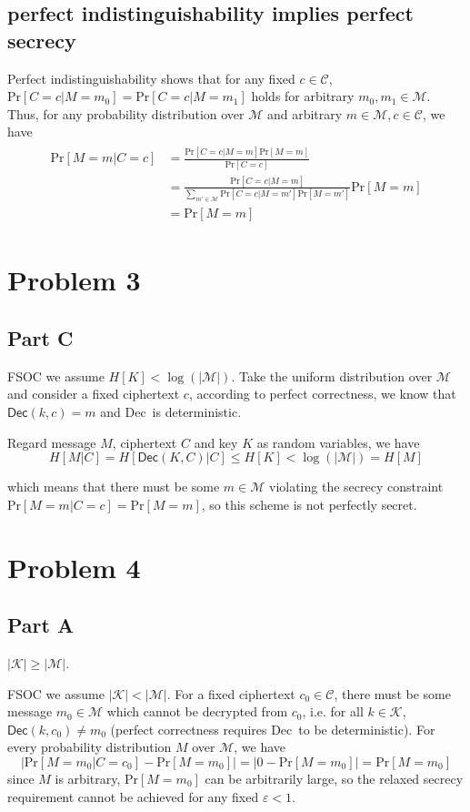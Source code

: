 \documentclass[8pt]{article}
\theoremstyle{compact}
\def\le{\leqslant}
\def\ge{\geqslant}
\def\Pr#1{\text{Pr}\left[{#1}\right]}
\def\Dec{\textsf{Dec}}
\begin{document}
\subsection*{perfect indistinguishability implies perfect secrecy}
Perfect indistinguishability shows that for any fixed $c \in \mathcal C$, $\Pr{C = c | M = m_0} = \Pr{C = c | M = m_1}$ holds for arbitrary $m_0, m_1 \in \mathcal M$. Thus, for any probability distribution over $\mathcal M$ and arbitrary $m \in \mathcal M, c \in \mathcal C$, we have \begin{align*}
	\begin{split}
		\Pr{M = m | C = c} &= \frac{\Pr{C = c | M = m}\Pr{M = m}}{\Pr{C = c}} \\& = \frac{\Pr{C = c | M = m}}{\sum_{m' \in \mathcal M}\Pr{C = c | M = m'}\Pr{M = m'}}\Pr{M = m} \\&= \Pr{M = m}
	\end{split}
\end{align*}

\section*{Problem 3}
\subsection*{Part C}
FSOC we assume $H[K] < \log(|\mathcal M|)$. Take the uniform distribution over $\mathcal M$ and consider a fixed ciphertext $c$, according to perfect correctness, we know that $\Dec(k, c) = m$ and \Dec\ is deterministic.

Regard message $M$, ciphertext $C$ and key $K$ as random variables, we have $$H[M | C] = H[\Dec(K, C) | C] \le H[K] < \log(|\mathcal M|) = H[M]$$

which means that there must be some $m \in \mathcal M$ violating the secrecy constraint $\Pr{M = m | C = c} = \Pr{M = m}$, so this scheme is not perfectly secret.

\section*{Problem 4}
\subsection*{Part A}

$|\mathcal K| \ge |\mathcal M|$.

FSOC we assume $|\mathcal K| < |\mathcal M|$. For a fixed ciphertext $c_0 \in \mathcal C$, there must be some message $m_0 \in \mathcal M$ which cannot be decrypted from $c_0$, i.e. for all $k \in \mathcal K$, $\Dec(k, c_0) \neq m_0$ (perfect correctness requires \Dec\ to be deterministic). For every probability distribution $M$ over $\mathcal M$, we have $$\left|\Pr{M = m_0 | C = c_0} - \Pr{M = m_0}\right| = \left|0 - \Pr{M = m_0}\right| = \Pr{M = m_0}$$
since $M$ is arbitrary, $\Pr{M = m_0}$ can be arbitrarily large, so the relaxed secrecy requirement cannot be achieved for any fixed $\varepsilon < 1$.
\end{document}
